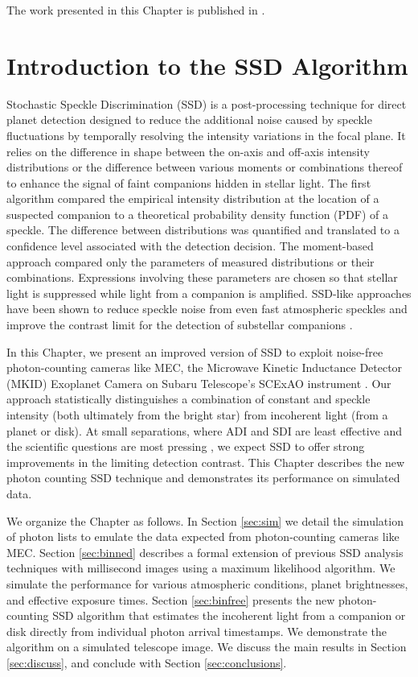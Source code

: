 \documentclass[../main.tex]{subfiles}
\begin{document}
The work presented in this Chapter is published in \textcite{Walter_2019}. 

\section{Introduction to the SSD Algorithm}
Stochastic Speckle Discrimination (SSD) is a post-processing technique for direct planet detection designed to reduce the additional noise caused by speckle fluctuations by temporally resolving the intensity variations in the focal plane. It relies on the difference in shape between the on-axis and off-axis intensity distributions \parencite{Soummer_2007a, Gladysz_2008b} or the difference between various moments or combinations thereof \parencite{Gladysz_2009, Gladysz_2010} to enhance the signal of faint companions hidden in stellar light. The first algorithm \parencite{Gladysz_2008} compared the empirical intensity distribution at the location of a suspected companion to a theoretical probability density function (PDF) of a speckle. The difference between distributions was quantified and translated to a confidence level associated with the detection decision. The moment-based approach compared only the parameters of measured distributions \parencite{Gladysz_2009, Gladysz_2010} or their combinations. Expressions involving these parameters are chosen so that stellar light is suppressed while light from a companion is amplified. SSD-like approaches have been shown to reduce speckle noise from even fast atmospheric speckles and improve the contrast limit for the detection of substellar companions \parencite{Frazin_2016, Meeker2018, Stangalini_2018}.

In this Chapter, we present an improved version of SSD to exploit noise-free photon-counting cameras like MEC, the Microwave Kinetic Inductance Detector (MKID) Exoplanet Camera \parencite{Walter2018, Meeker2018} on Subaru Telescope's SCExAO instrument \parencite{Lozi2018}. Our approach statistically distinguishes a combination of constant and speckle intensity (both ultimately from the bright star) from incoherent light (from a planet or disk). At small separations, where ADI and SDI are least effective and the scientific questions are most pressing \parencite{Mawet2012}, we expect SSD to offer strong improvements in the limiting detection contrast. This Chapter describes the new photon counting SSD technique and demonstrates its performance on simulated data. 

We organize the Chapter as follows. In Section \ref{sec:sim} we detail the simulation of photon lists to emulate the data expected from photon-counting cameras like MEC. Section \ref{sec:binned} describes a formal extension of previous SSD analysis techniques with millisecond images using a maximum likelihood algorithm. We simulate the performance for various atmospheric conditions, planet brightnesses, and effective exposure times. Section \ref{sec:binfree} presents the new photon-counting SSD algorithm that estimates the incoherent light from a companion or disk directly from individual photon arrival timestamps. We demonstrate the algorithm on a simulated telescope image. We discuss the main results in Section \ref{sec:discuss}, and conclude with Section \ref{sec:conclusions}. 
\end{document}
